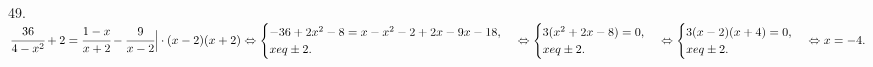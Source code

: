 49. $\cfrac{36}{4-x^2}+2=\cfrac{1-x}{x+2}-\cfrac{9}{x-2}\Big|\cdot(x-2)(x+2)\Leftrightarrow\begin{cases}-36+2x^2-8=x-x^2-2+2x-9x-18,\\x
eq\pm2.\end{cases}
\Leftrightarrow\begin{cases}3(x^2+2x-8)=0,\\x
eq\pm2.\end{cases}\Leftrightarrow\begin{cases}3(x-2)(x+4)=0,\\x
eq\pm2.\end{cases}\Leftrightarrow x=-4.$\\
